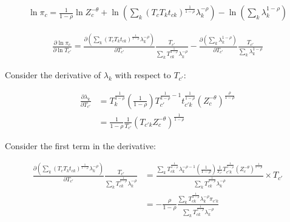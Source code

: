 \documentclass[10pt]{article}
\begin{document}
\begin{align*}
    \ln \pi_c = \frac{1}{1 - \rho} \ln Z_c^{- \theta} + \ln \left( \sum_{k}^{} (T_c T_k t_{ck})^{\frac{1}{1 - \rho}} \lambda_k^{- \rho} \right) - \ln \left( \sum_{k}^{} \lambda_k^{1 - \rho} \right)
\end{align*}

\begin{align*}
    \frac{\partial \ln \pi_c}{\partial \ln T_{c'}} = \frac{\partial \left( \sum_{k}^{} (T_c T_k t_{ck})^{\frac{1}{1 - \rho}} \lambda_k^{- \rho} \right)}{\partial T_{c'}} \frac{T_{c'}}{\sum_{k}^{} T_{ck}^{\frac{1}{1 - \rho}} \lambda_k^{- \rho}} - \frac{\partial \left( \sum_{k}^{} \lambda_k^{1 - \rho} \right)}{\partial T_{c'}} \frac{T_{c'}}{\sum_{k}^{} \lambda_k^{1 - \rho}}
\end{align*}

Consider the derivative of $\lambda_k$ with respect to $T_{c'}$:

\begin{align*}
    \frac{\partial \lambda_k}{\partial T_{c'}} & = T_k^{\frac{1}{1 - \rho}} \left( \frac{1}{1 - \rho} \right) T_{c'}^{\frac{1}{1 - \rho} - 1} t_{c'k}^{\frac{1}{1 - \rho}} (Z_c^{- \theta})^{\frac{\rho}{1 - \rho}} \\
                                               & = \frac{1}{1 - \rho} \frac{1}{T_{c'}} (T_{c'k} Z_c^{- \theta})^{\frac{1}{1 - \rho}}
\end{align*}

Consider the first term in the derivative:

\begin{align*}
    \frac{\partial \left( \sum_{k}^{} (T_c T_k t_{ck})^{\frac{1}{1 - \rho}} \lambda_k^{- \rho} \right)}{\partial T_{c'}} \frac{T_{c'}}{\sum_{k}^{} T_{ck}^{\frac{1}{1 - \rho}} \lambda_k^{- \rho}} & = \frac{\sum_{k}^{} T_{ck}^{\frac{1}{1 - \rho}} \lambda_k^{-\rho - 1} \left( \frac{1}{1 - \rho} \right) \frac{1}{T_{c'}} T_{c'k}^{\frac{1}{1 - \rho}} (Z_c^{- \theta})^{\frac{1}{1 - \rho}}}{\sum_{k}^{} T_{ck}^{\frac{1}{1 - \rho}} \lambda_k^{- \rho}} \times T_{c'} \\
                                                                                                                                                                                                   & = - \frac{\rho}{1 - \rho} \frac{\sum_{k}^{}T_{ck}^{\frac{1}{1 - \rho}} \lambda_k^{- \rho} \pi_{c'k}}{\sum_{k}^{} T_{ck}^{\frac{1}{1 - \rho}} \lambda_k^{- \rho}}                                                                                                       \\
\end{align*}
\end{document}
